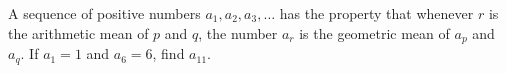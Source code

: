 A sequence of positive numbers $a_1,a_2,a_3,\dots$ has the property that whenever $r$ is the arithmetic mean of $p$ and $q$, the number $a_r$ is the geometric mean of $a_p$ and $a_q$. If $a_1=1$ and $a_6=6$, find $a_{11}$.

